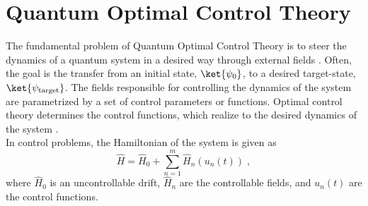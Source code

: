 \chapter{Quantum Optimal Control Theory} \label{chap:OptimalControl}
The fundamental problem of Quantum Optimal Control Theory is to steer the dynamics of a quantum system in a desired way through external fields \cite{Rice2000,Shapiro2003}. Often, the goal is the transfer from an initial state, $\ket{\psi_0}$, to a desired target-state, $\ket{\psi_{\mathrm{target}}}$. The fields responsible for controlling the dynamics of the system are parametrized by a set of control parameters or functions. Optimal control theory determines the control functions, which realize to the desired dynamics of the system \cite{Werschnik2007}.\\ 
In control problems, the Hamiltonian of the system is given as
\begin{equation}
	\hat{H} =  \hat{H}_0 + \sum_{n = 1}^{m}  \hat{H}_n (u_n(t)) \; ,
	\label{eq:ControlHamiltonians}
\end{equation} 
where $\hat{H}_0$ is an uncontrollable drift, $\hat{H}_n$ are the controllable fields, and $u_n(t)$ are the control functions.


